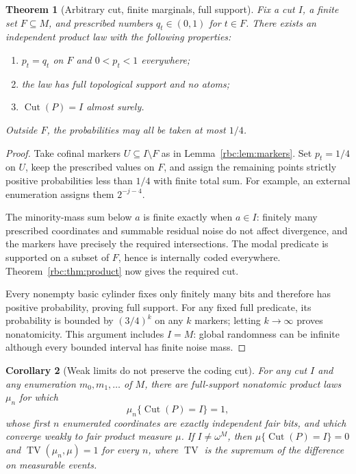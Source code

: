 \documentclass[11pt]{article}
\numberwithin{equation}{section}
\newtheorem{theorem}{Theorem}[section]
\newtheorem{corollary}[theorem]{Corollary}
\theoremstyle{definition}
\theoremstyle{remark}
\newcommand{\std}{\omega^M}
\newcommand{\Cut}{\operatorname{Cut}}
\newcommand{\TV}{\operatorname{TV}}
\begin{document}
\begin{theorem}[Arbitrary cut, finite marginals, full support]
\label{rbc:thm:realization}
Fix a cut $I$, a finite set $F\subseteq M$, and prescribed numbers
$q_t\in(0,1)$ for $t\in F$. There exists an independent product law with
the following properties:
\begin{enumerate}[label=(\roman*)]
\item $p_t=q_t$ on $F$ and $0<p_t<1$ everywhere;
\item the law has full topological support and no atoms;
\item $\Cut(P)=I$ almost surely.
\end{enumerate}
Outside $F$, the probabilities may all be taken at most $1/4$.
\end{theorem}

\begin{proof}
Take cofinal markers $U\subseteq I\setminus F$ as in
Lemma~\ref{rbc:lem:markers}. Set $p_t=1/4$ on $U$, keep the prescribed values
on $F$, and assign the remaining points strictly positive probabilities
less than $1/4$ with finite total sum. For example, an external enumeration
assigns them $2^{-j-4}$.

The minority-mass sum below $a$ is finite exactly when $a\in I$: finitely
many prescribed coordinates and summable residual noise do not affect
divergence, and the markers have precisely the required intersections.
The modal predicate is supported on a subset of $F$, hence is internally
coded everywhere. Theorem~\ref{rbc:thm:product} now gives the required cut.

Every nonempty basic cylinder fixes only finitely many bits and therefore
has positive probability, proving full support. For any fixed full
predicate, its probability is bounded by $(3/4)^k$ on any $k$ markers;
letting $k\to\infty$ proves nonatomicity. This argument includes $I=M$:
global randomness can be infinite although every bounded interval has
finite noise mass.
\end{proof}

\begin{corollary}[Weak limits do not preserve the coding cut]
\label{rbc:cor:weak}
For any cut $I$ and any enumeration $m_0,m_1,\ldots$ of $M$, there are
full-support nonatomic product laws $\mu_n$ for which
\[
 \mu_n\{\Cut(P)=I\}=1,
\]
whose first $n$ enumerated coordinates are exactly independent fair bits,
and which converge weakly to fair product measure $\mu$. If $I\ne\std$,
then $\mu\{\Cut(P)=I\}=0$ and $\TV(\mu_n,\mu)=1$ for every $n$, where
$\TV$ is the supremum of the difference on measurable events.
\end{corollary}
\end{document}
